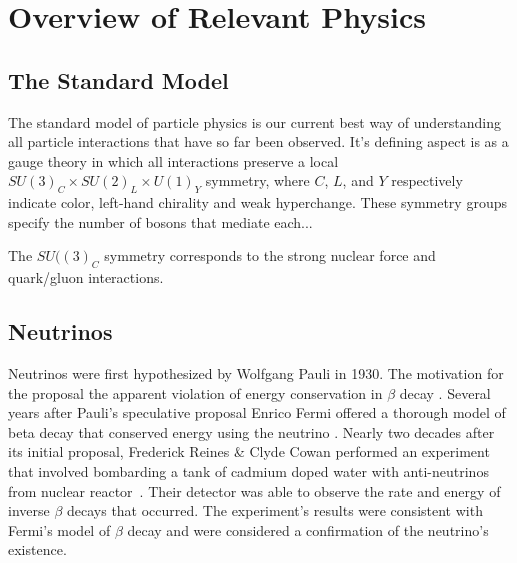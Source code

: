 
\chapter{Overview of Relevant Physics}

\ifpdf
    \graphicspath{{physics/figures/PNG/}{physics/figures/PDF/}{physics/figures/}}
\else
    \graphicspath{{physics/figures/EPS/}{physics/figures/}}
\fi

\section{The Standard Model}
The standard model of particle physics is our current best way of understanding
all particle interactions that have so far been observed.
It's defining aspect is as a gauge theory in which all interactions
preserve a local $SU{(3)}_C \times SU{(2)}_L \times U{(1)}_Y$ symmetry, where
$C$, $L$, and $Y$ respectively indicate color, left-hand chirality and weak hyperchange.
These symmetry groups specify the number of bosons that mediate each...

The $SU({(3)}_C$ symmetry corresponds to the strong nuclear force and quark/gluon
interactions.

\section{Neutrinos}
Neutrinos were first hypothesized by Wolfgang Pauli in 1930.
The motivation for the proposal the apparent violation of energy
conservation in $\beta$ decay \citep{pauli_letter}.
Several years after Pauli's speculative proposal Enrico Fermi offered
a thorough model of beta decay that conserved energy using the neutrino
\citep{fermi_beta_decay}.
Nearly two decades after its initial proposal, Frederick Reines \&
Clyde Cowan performed an experiment that involved bombarding a tank of cadmium
doped water with anti-neutrinos from nuclear reactor~\cite{cowan_reines}.
Their detector was able to observe the rate and energy of inverse $\beta$
decays that occurred.
The experiment's results were consistent with Fermi's model of $\beta$ decay and were
considered a confirmation of the neutrino's existence.

